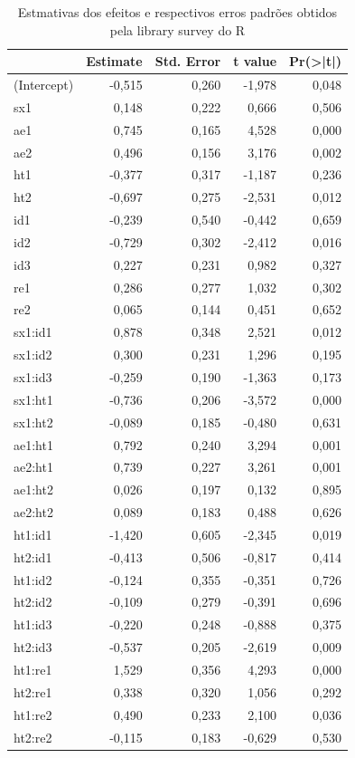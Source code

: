 \documentclass[]{book}
\theoremstyle{definition}
\theoremstyle{definition}
\theoremstyle{definition}
\theoremstyle{remark}
\begin{document}
\begin{table}

\caption{\label{tab:logit}Estmativas dos efeitos e respectivos erros padrões obtidos pela library survey do R}
\centering
\begin{tabular}[t]{lrrrr}
\toprule
  & Estimate & Std. Error & t value & Pr(>|t|)\\
\midrule
(Intercept) & -0,515 & 0,260 & -1,978 & 0,048\\
sx1 & 0,148 & 0,222 & 0,666 & 0,506\\
ae1 & 0,745 & 0,165 & 4,528 & 0,000\\
ae2 & 0,496 & 0,156 & 3,176 & 0,002\\
ht1 & -0,377 & 0,317 & -1,187 & 0,236\\
\addlinespace
ht2 & -0,697 & 0,275 & -2,531 & 0,012\\
id1 & -0,239 & 0,540 & -0,442 & 0,659\\
id2 & -0,729 & 0,302 & -2,412 & 0,016\\
id3 & 0,227 & 0,231 & 0,982 & 0,327\\
re1 & 0,286 & 0,277 & 1,032 & 0,302\\
\addlinespace
re2 & 0,065 & 0,144 & 0,451 & 0,652\\
sx1:id1 & 0,878 & 0,348 & 2,521 & 0,012\\
sx1:id2 & 0,300 & 0,231 & 1,296 & 0,195\\
sx1:id3 & -0,259 & 0,190 & -1,363 & 0,173\\
sx1:ht1 & -0,736 & 0,206 & -3,572 & 0,000\\
\addlinespace
sx1:ht2 & -0,089 & 0,185 & -0,480 & 0,631\\
ae1:ht1 & 0,792 & 0,240 & 3,294 & 0,001\\
ae2:ht1 & 0,739 & 0,227 & 3,261 & 0,001\\
ae1:ht2 & 0,026 & 0,197 & 0,132 & 0,895\\
ae2:ht2 & 0,089 & 0,183 & 0,488 & 0,626\\
\addlinespace
ht1:id1 & -1,420 & 0,605 & -2,345 & 0,019\\
ht2:id1 & -0,413 & 0,506 & -0,817 & 0,414\\
ht1:id2 & -0,124 & 0,355 & -0,351 & 0,726\\
ht2:id2 & -0,109 & 0,279 & -0,391 & 0,696\\
ht1:id3 & -0,220 & 0,248 & -0,888 & 0,375\\
\addlinespace
ht2:id3 & -0,537 & 0,205 & -2,619 & 0,009\\
ht1:re1 & 1,529 & 0,356 & 4,293 & 0,000\\
ht2:re1 & 0,338 & 0,320 & 1,056 & 0,292\\
ht1:re2 & 0,490 & 0,233 & 2,100 & 0,036\\
ht2:re2 & -0,115 & 0,183 & -0,629 & 0,530\\
\bottomrule
\end{tabular}
\end{table}
\end{document}
